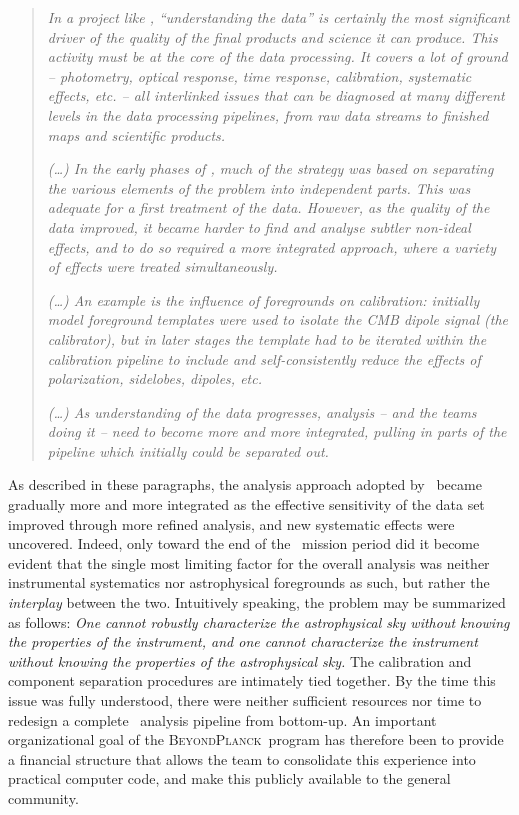 \documentclass[twocolumn]{aa}
\newcommand{\BP}{\textsc{BeyondPlanck}}
\begin{document}
\begin{quotation}
\emph{In a project like \Planck, ``understanding the data'' is
  certainly the most significant driver of the quality of the final
  products and science it can produce. This activity must be at the
  core of the data processing. It covers a lot of ground --
  photometry, optical response, time response, calibration, systematic
  effects, etc. -- all interlinked issues that can be diagnosed at
  many different levels in the data processing pipelines, from raw
  data streams to finished maps and scientific products.}

\emph{(\ldots) In the early phases of \Planck, much of the strategy was based on
  separating the various elements of the problem into independent
  parts. This was adequate for a first treatment of the data.
  However, as the quality of the data improved, it became harder to
  find and analyse subtler non-ideal effects, and to do so required a
  more integrated approach, where a variety of effects were treated
  simultaneously.}

\emph{(\ldots) An example is the influence of foregrounds on
  calibration: initially model foreground templates were used to
  isolate the CMB dipole signal (the calibrator), but in later stages
  the template had to be iterated within the calibration pipeline to
  include and self-consistently reduce the effects of polarization,
  sidelobes, dipoles, etc.}

\emph{(\ldots) As understanding of the data progresses, analysis --
  and the teams doing it -- need to become more and more integrated,
  pulling in parts of the pipeline which initially could be separated
  out.}
\end{quotation}

As described in these paragraphs, the analysis approach adopted by
\Planck\ became gradually more and more integrated as the effective
sensitivity of the data set improved through more refined analysis,
and new systematic effects were uncovered. Indeed, only toward the end
of the \Planck\ mission period did it become evident that the single
most limiting factor for the overall analysis was neither instrumental
systematics nor astrophysical foregrounds as such, but rather the
\emph{interplay} between the two. Intuitively speaking, the problem
may be summarized as follows: \emph{One cannot robustly characterize
  the astrophysical sky without knowing the properties of the
  instrument, and one cannot characterize the instrument without
  knowing the properties of the astrophysical sky.}  The calibration
and component separation procedures are intimately tied together. By
the time this issue was fully understood, there were neither
sufficient resources nor time to redesign a complete \Planck\ analysis
pipeline from bottom-up. An important organizational goal of the
\BP\ program has therefore been to provide a financial structure that
allows the team to consolidate this experience into practical computer
code, and make this publicly available to the general community.
\end{document}
